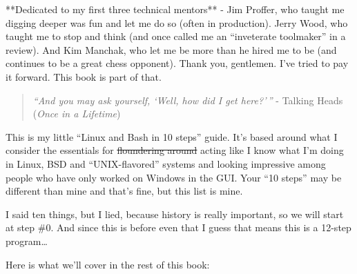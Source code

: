 \documentclass[10pt,]{book}
\numberwithin{figure}{chapter}
\begin{document}
\fi
**Dedicated to my first three technical mentors** - Jim Proffer, who
taught me digging deeper was fun and let me do so (often in production).
Jerry Wood, who taught me to stop and think (and once called me an
``inveterate toolmaker'' in a review). And Kim Manchak, who let me be
more than he hired me to be (and continues to be a great chess
opponent). Thank you, gentlemen. I've tried to pay it forward. This book
is part of that.

\ifxetex\setcounter{chapter}{-2}\fi


\begin{quote}
\emph{``And you may ask yourself, `Well, how did I get here?'\,''} -
Talking Heads (\emph{Once in a Lifetime})
\end{quote}

This is my little ``Linux and Bash in 10 steps'' guide. It's based
around what I consider the essentials for \sout{floundering around}
acting like I know what I'm doing in Linux, BSD and ``UNIX-flavored''
systems and looking impressive among people who have only worked on
Windows in the GUI. Your ``10 steps'' may be different than mine and
that's fine, but this list is mine.

I said ten things, but I lied, because history is really important, so
we will start at step \#0. And since this is before even that I guess
that means this is a 12-step program\ldots{}

Here is what we'll cover in the rest of this book:
\end{document}
